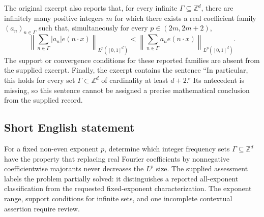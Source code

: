\documentclass[11pt]{article}
\newcommand{\Z}{\mathbb{Z}}
\begin{document}
The original excerpt also reports that, for every infinite \(\Gamma\subseteq\Z^d\), there are infinitely many positive integers \(m\) for which there exists a real coefficient family \((a_n)_{n\in\Gamma}\) such that, simultaneously for every \(p\in(2m,2m+2)\),
\[
\left\|\sum_{n\in\Gamma}|a_n|e(n\cdot x)\right\|_{L^p([0,1]^d)}
<
\left\|\sum_{n\in\Gamma}a_ne(n\cdot x)\right\|_{L^p([0,1]^d)}.
\]
The support or convergence conditions for these reported families are absent from the supplied excerpt. Finally, the excerpt contains the sentence ``In particular, this holds for every set \(\Gamma\subset\Z^d\) of cardinality at least \(d+2\).'' Its antecedent is missing, so this sentence cannot be assigned a precise mathematical conclusion from the supplied record.
\subsection{Short English statement}
For a fixed non-even exponent \(p\), determine which integer frequency sets \(\Gamma\subseteq\Z^d\) have the property that replacing real Fourier coefficients by nonnegative coefficientwise majorants never decreases the \(L^p\) size. The supplied assessment labels the problem partially solved: it distinguishes a reported all-exponent classification from the requested fixed-exponent characterization. The exponent range, support conditions for infinite sets, and one incomplete contextual assertion require review.
\end{document}
